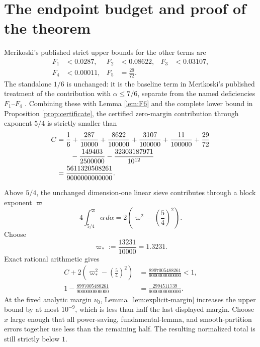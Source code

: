 \documentclass[10pt,reqno]{amsart}
\newcommand{\1}{\mathbf{1}}
\theoremstyle{plain}
\theoremstyle{remark}
\begin{document}
\section{The endpoint budget and proof of the theorem}

Merikoski's published strict upper bounds for the other terms are
\begin{align*}
 F_1&<0.0287,& F_2&<0.08622,& F_3&<0.03107,\\
 F_4&<0.00011,& F_5&=\frac{29}{72}.
\end{align*}
The standalone $1/6$ is unchanged: it is the baseline term in Merikoski's
published treatment of the contribution with $\alpha\le7/6$, separate from
the named deficiencies $F_1$--$F_4$
\cite[Section 2.6, proof of Theorem 2]{Merikoski2020}.
Combining these with Lemma \ref{lem:F6} and the complete lower bound in Proposition
\ref{prop:certificate}, the certified zero-margin contribution through
exponent $5/4$ is strictly smaller than
\begin{align}\label{eq:core}
  C&=\frac16+\frac{287}{10000}+\frac{8622}{100000}
      +\frac{3107}{100000}+\frac{11}{100000}+\frac{29}{72}\notag\\
  &\qquad-\frac{149403}{2500000}-\frac{32303187971}{10^{12}}\notag\\
  &=\frac{5611320508261}{9000000000000}.
\end{align}

Above $5/4$, the unchanged dimension-one linear sieve contributes through a
block exponent $\varpi$
\begin{equation}\label{eq:tail}
 4\int_{5/4}^{\varpi}\alpha\,d\alpha
 =2\left(\varpi^2-\left(\frac54\right)^2\right).
\end{equation}
Choose
\[
 \varpi_*:=\frac{13231}{10000}=1.3231.
\]
Exact rational arithmetic gives
\begin{align}\label{eq:budget}
 C+2\left(\varpi_*^2-\left(\frac54\right)^2\right)
 &=\frac{8997005488261}{9000000000000}<1,\\
1-\frac{8997005488261}{9000000000000}
&=\frac{2994511739}{9000000000000}.
\end{align}
At the fixed analytic margin $\nu_0$, Lemma~\ref{lem:explicit-margin}
increases the upper bound by at most $10^{-9}$, which is less than half the
last displayed margin.  Choose $x$ large enough that all power-saving,
fundamental-lemma, and smooth-partition errors together use less than the
remaining half.  The resulting normalized total is still strictly below
$1$.
\end{document}
